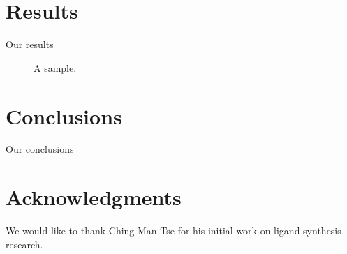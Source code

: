 \documentclass{sig-alternate}
\begin{document}
\section{Results}
Our results

\begin{figure}
\centering
\caption{A sample.}
\end{figure}

\section{Conclusions}
Our conclusions

\section{Acknowledgments}
We would like to thank Ching-Man Tse for his initial work on ligand synthesis research.

%

%
%
\end{document}
